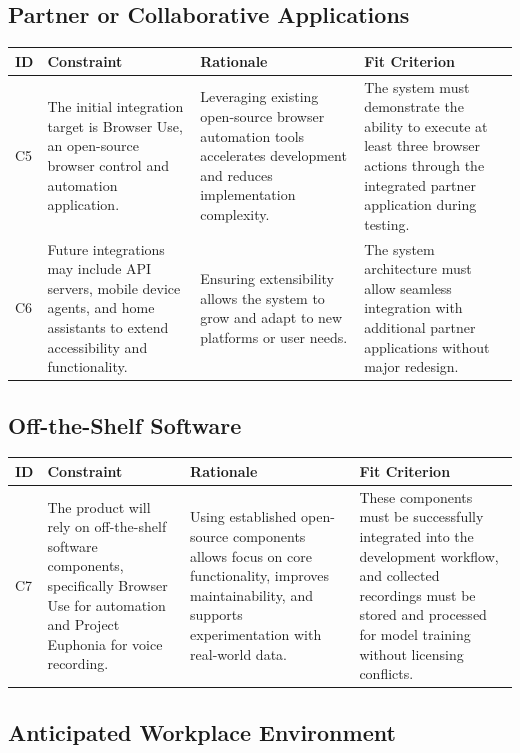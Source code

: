 \documentclass[11pt]{article}
\begin{document}
\subsection{Partner or Collaborative Applications}


\begin{tabularx}{\textwidth}{p{1cm}X X X}
\toprule
\textbf{ID} & \textbf{Constraint} & \textbf{Rationale} & \textbf{Fit Criterion} \\
\midrule
C5 & The initial integration target is Browser Use, an open-source browser control and automation application. & Leveraging existing open-source browser automation tools accelerates development and reduces implementation complexity. & The system must demonstrate the ability to execute at least three browser actions through the integrated partner application during testing. \\
\hline
C6 & Future integrations may include API servers, mobile device agents, and home assistants to extend accessibility and functionality. & Ensuring extensibility allows the system to grow and adapt to new platforms or user needs. & The system architecture must allow seamless integration with additional partner applications without major redesign. \\
\bottomrule
\end{tabularx}

\subsection{Off-the-Shelf Software}

\begin{tabularx}{\textwidth}{p{1cm}X X X}
\toprule
\textbf{ID} & \textbf{Constraint} & \textbf{Rationale} & \textbf{Fit Criterion} \\
\midrule
C7 & The product will rely on off-the-shelf software components, specifically Browser Use for automation and Project Euphonia for voice recording. & Using established open-source components allows focus on core functionality, improves maintainability, and supports experimentation with real-world data. & These components must be successfully integrated into the development workflow, and collected recordings must be stored and processed for model training without licensing conflicts. \\
\bottomrule
\end{tabularx}

\subsection{Anticipated Workplace Environment}
\end{document}
